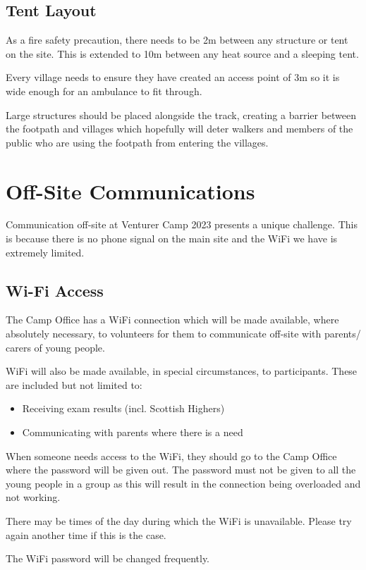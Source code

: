 \documentclass[a4paper, 11pt]{report}
\begin{document}
\section{Tent Layout}
As a fire safety precaution, there needs to be 2m between any structure or tent on the site. This is extended to 10m between any heat source and a sleeping tent. \nl

Every village needs to ensure they have created an access point of 3m so it is wide enough for an ambulance to fit through. \nl

Large structures should be placed alongside the track, creating a barrier between the footpath and villages which hopefully will deter walkers and members of the public who are using the footpath from entering the villages. 

\chapter{Off-Site Communications}
Communication off-site at Venturer Camp 2023 presents a unique challenge. This is because there is no phone signal on the main site and the WiFi we have is extremely limited.
\section{Wi-Fi Access}
The Camp Office has a WiFi connection which will be made available, where absolutely necessary, to volunteers for them to communicate off-site with parents/ carers of young people. \nl

WiFi will also be made available, in special circumstances, to participants. These are included but not limited to:
\begin{itemize}
    \item Receiving exam results (incl. Scottish Highers)
    \item Communicating with parents where there is a need
\end{itemize}

When someone needs access to the WiFi, they should go to the Camp Office where the password will be given out. The password must not be given to all the young people in a group as this will result in the connection being overloaded and not working.\nl

There may be times of the day during which the WiFi is unavailable. Please try again another time if this is the case.\nl

The WiFi password will be changed frequently.
\end{document}
